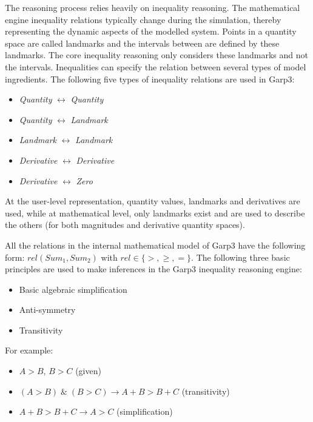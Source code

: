 \documentclass{article} %
\begin{document}
The reasoning process relies heavily on inequality reasoning.
The mathematical engine inequality relations typically change during the 
simulation, thereby representing the dynamic aspects of the modelled system. 
Points in a quantity 
space are called landmarks and the intervals between are defined by these
landmarks. The core inequality reasoning only considers these landmarks and not
the intervals. Inequalities can specify the relation between several types of
model ingredients. The following five types of inequality relations are used in
Garp3:

\begin{itemize}

\item \emph{Quantity} $\leftrightarrow$ \emph{Quantity}

\item \emph{Quantity} $\leftrightarrow$ \emph{Landmark}

\item \emph{Landmark} $\leftrightarrow$ \emph{Landmark}

\item \emph{Derivative} $\leftrightarrow$ \emph{Derivative}

\item \emph{Derivative} $\leftrightarrow$ \emph{Zero}

\end{itemize}

At the user-level representation, quantity values, landmarks and derivatives are
used, while at mathematical level, only landmarks exist and are used to
describe the others (for both magnitudes and derivative quantity spaces).


All the relations in the internal mathematical model of Garp3 have the
following form: $rel(Sum_1, Sum_2)$ with $rel \in \{>,\ge,=\}$. The following
three basic principles are used to make inferences in the Garp3 inequality
reasoning engine:

\begin{itemize}
\item Basic algebraic simplification
\item Anti-symmetry
\item Transitivity
\end{itemize}

For example:

\begin{itemize}
\item $A>B$, $B>C$ (given)
\item $(A>B) \; \& \; (B>C) \rightarrow A+B>B+C$ (transitivity)
\item $A+B>B+C \rightarrow A>C$ (simplification)
\end{itemize}
\end{document}
